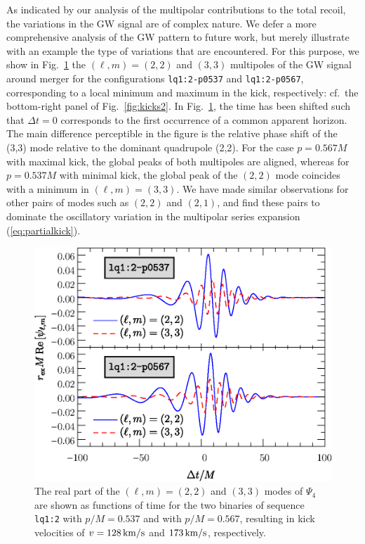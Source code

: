 \documentclass[floats,floatfix,showpacs,amssymb,prd,twocolumn,superscriptaddress,nofootinbib,nolongbibliography,reprint]{revtex4-2}
\newcounter{count}
\begin{document}
As indicated by our analysis of the multipolar contributions
to the total recoil, the variations in the GW signal are of
complex nature. We defer a more comprehensive analysis of
the GW pattern to future work, but merely illustrate with an 
example the type of variations that are encountered.
For this purpose, we show in Fig.~\ref{fig:psi4modes}
the $(\ell,m)=(2,2)$ and $(3,3)$ multipoles of the
GW signal around merger for the configurations \texttt{lq1:2-p0537} 
and \texttt{lq1:2-p0567}, corresponding to a local minimum and 
maximum in the
kick, respectively: cf.~the bottom-right panel of Fig.~\ref{fig:kicks2}. In Fig.~\ref{fig:psi4modes},
the time has been shifted such that $\Delta t =0$ corresponds
to the first occurrence of a common apparent horizon. The main
difference perceptible in the figure is the relative phase shift of
the (3,3) mode relative to the dominant quadrupole (2,2). For the
case $p=0.567M$ with maximal kick, the global peaks of both multipoles
are aligned, whereas for $p=0.537M$ with minimal kick, the global peak
of the $(2,2)$ mode coincides with a minimum in $(\ell,m)=(3,3)$. We
have made similar observations for other pairs of modes such as
$(2,2)$ and $(2,1)$, and find these pairs to dominate the oscillatory
variation in the multipolar series expansion (\ref{eq:partialkick}).
%
\begin{figure}[t]
    \centering
    \includegraphics[width=\columnwidth,clip=true]{mode-kick-extrema.eps}    
    \caption{The real part of the $(\ell,m)=(2,2)$ and $(3,3)$ modes of $\Psi_4$
             are shown as functions of time for the two binaries
             of sequence \texttt{lq1:2} with $p/M=0.537$ and with $p/M=0.567$,
             resulting in kick velocities of $v = 128\,{\rm km/s}$
             and $173\,{\rm km/s}$, respectively.
            }
             \label{fig:psi4modes}
\end{figure}
%
\end{document}
